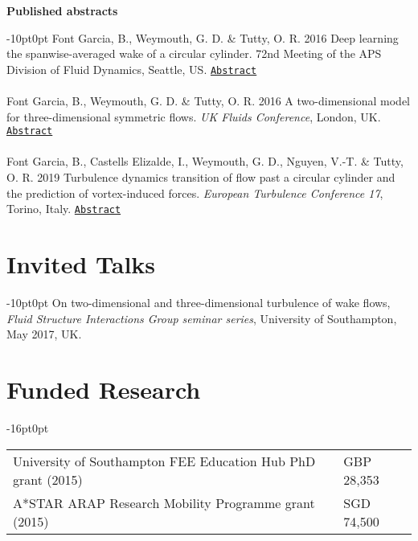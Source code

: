 \documentclass[line]{res}
\newenvironment{p}
  {\begin{adjustwidth}{-10pt}{0pt}}
  {\end{adjustwidth}}
\newenvironment{p3}
  {\begin{adjustwidth}{-16pt}{0pt}
  \vspace{3pt}}
  {\end{adjustwidth}}
\begin{document}
\begin{resume}
\hspace{-1cm}\textbf{Published abstracts}\vspace{0.25cm}
\begin{p}
Font Garcia, B., Weymouth, G. D.  \&  Tutty, O. R. 2016  Deep learning the spanwise-averaged wake of a circular cylinder. 72nd Meeting of the APS Division of Fluid Dynamics, Seattle, US.  \href{https://meetings.aps.org/Meeting/DFD19/Session/L17.5}{\texttt{Abstract}}\\
\\
Font Garcia, B., Weymouth, G. D.  \&  Tutty, O. R. 2016  A two-dimensional model for three-dimensional symmetric flows. \textit{UK Fluids Conference}, London, UK.  \href{https://www.imperial.ac.uk/media/imperial-college/faculty-of-engineering/aeronautics/UK-Fluids-Conference-2016-booklet.pdf}{\texttt{Abstract}}\\
\\
Font Garcia, B., Castells Elizalde, I., Weymouth, G. D., Nguyen, V.-T.  \&  Tutty, O. R. 2019  Turbulence dynamics transition of flow past a circular cylinder and the prediction of vortex-induced forces. \textit{European Turbulence Conference 17}, Torino, Italy.  \href{https://etc17.fyper.com/program/show_slot/41}{\texttt{Abstract}}
\end{p}

\section{Invited Talks}
\begin{p}
On two-dimensional and three-dimensional turbulence of wake flows, \textit{Fluid Structure Interactions Group seminar series}, University of Southampton, May 2017, UK.
\end{p}

\section{Funded Research}
\begin{p3}
\begin{tabular}{p{} >{\raggedleft\arraybackslash}p{}}
University of Southampton FEE Education Hub PhD grant (2015) & GBP 28,353\\
A*STAR ARAP Research Mobility Programme grant (2015) & SGD 74,500
\end{tabular}
\end{p3}


\end{resume}
\end{document}
